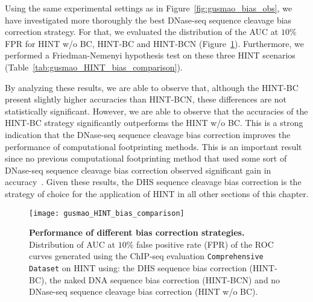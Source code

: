 Using the same experimental settings as in Figure~\ref{fig:gusmao_bias_obs}, we have investigated more thoroughly the best DNase-seq sequence cleavage bias correction strategy. For that, we evaluated the distribution of the AUC at $10\%$ FPR for HINT w/o BC, HINT-BC and HINT-BCN (Figure~\ref{fig:gusmao_HINT_bias_comparison}). Furthermore, we performed a Friedman-Nemenyi hypothesis test on these three HINT scenarios (Table~\ref{tab:gusmao_HINT_bias_comparison}).

By analyzing these results, we are able to observe that, although the HINT-BC present slightly higher accuracies than HINT-BCN, these differences are not statistically significant. However, we are able to observe that the accuracies of the HINT-BC strategy significantly outperforms the HINT w/o BC. This is a strong indication that the DNase-seq sequence cleavage bias correction improves the performance of computational footprinting methods. This is an important result since no previous computational footprinting method that used some sort of DNase-seq sequence cleavage bias correction observed significant gain in accuracy~\cite{yardimci2014,sung2014,kahara2015}. Given these results, the DHS sequence cleavage bias correction is the strategy of choice for the application of HINT in all other sections of this chapter.

\begin{figure}[h!]
\centering
\texttt{[image: gusmao\_HINT\_bias\_comparison]}
\caption[Performance of different bias correction strategies]{\textbf{Performance of different bias correction strategies.} Distribution of AUC at $10\%$ false positive rate (FPR) of the ROC curves generated using the ChIP-seq evaluation {\tt Comprehensive Dataset} on HINT using: the DHS sequence bias correction (HINT-BC), the naked DNA sequence bias correction (HINT-BCN) and no DNase-seq sequence cleavage bias correction (HINT w/o BC).}
\label{fig:gusmao_HINT_bias_comparison}
\end{figure}

